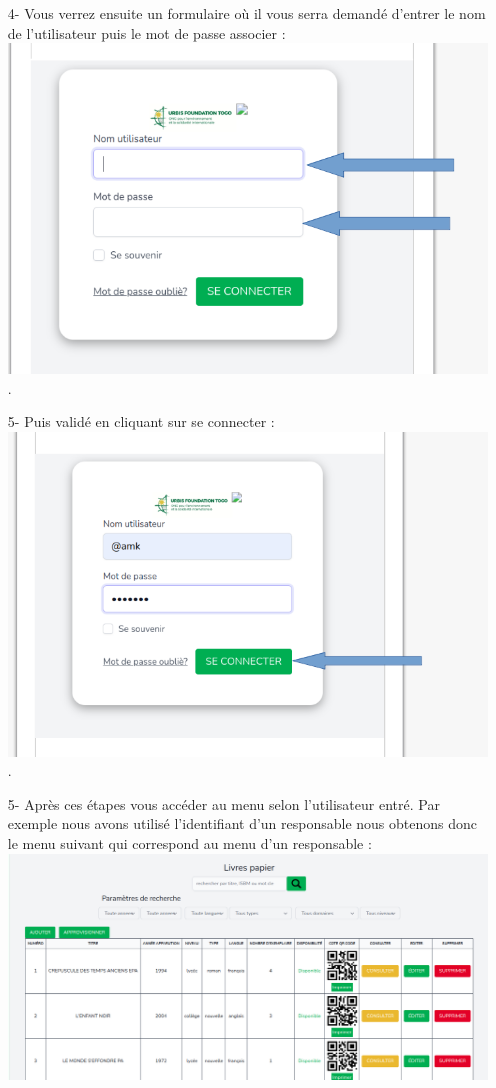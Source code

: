 \documentclass[12pt,a4paper]{article}
\begin{document}
\begin{itemize}
\item[4-]Vous verrez ensuite un formulaire où il vous serra demandé d'entrer le nom de l'utilisateur puis le mot de passe associer : \\
\includegraphics[scale=0.5]{end/identifiants.png}.\\
\item[5-]Puis validé en cliquant sur se connecter : \\
\includegraphics[scale=0.5]{end/enteridentifiant.png}.\\
\item[5-]Après ces étapes vous accéder au menu selon l'utilisateur entré. Par exemple nous avons utilisé l'identifiant d'un responsable nous obtenons donc le menu suivant qui correspond au menu d'un responsable : \\
\includegraphics[scale=0.35]{end/menuResponsable.png}

\end{itemize}
\end{document}
